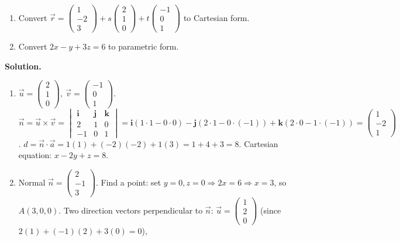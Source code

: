 \documentclass[11pt]{article}
\begin{document}
\begin{exoresolu}
\begin{enumerate}
\item Convert $\vec{r}=\begin{pmatrix}1\\-2\\3\end{pmatrix}+s\begin{pmatrix}2\\1\\0\end{pmatrix}+t\begin{pmatrix}-1\\0\\1\end{pmatrix}$ to Cartesian form.
\item Convert $2x-y+3z=6$ to parametric form.
\end{enumerate}
\tcblower
\textbf{Solution.}
\begin{enumerate}
\item $\vec{u}=\begin{pmatrix}2\\1\\0\end{pmatrix},\ \vec{v}=\begin{pmatrix}-1\\0\\1\end{pmatrix}$.
$\vec{n}=\vec{u}\times\vec{v}=\begin{vmatrix}\mathbf{i}&\mathbf{j}&\mathbf{k}\\2&1&0\\-1&0&1\end{vmatrix}
= \mathbf{i}(1\cdot1-0\cdot0) - \mathbf{j}(2\cdot1-0\cdot(-1)) + \mathbf{k}(2\cdot0-1\cdot(-1))
= \begin{pmatrix}1\\-2\\1\end{pmatrix}$.
$d=\vec{n}\cdot\vec{a}=1(1)+(-2)(-2)+1(3)=1+4+3=8$.
Cartesian equation: $\boxed{x-2y+z=8}$.
\item Normal $\vec{n}=\begin{pmatrix}2\\-1\\3\end{pmatrix}$. Find a point: set $y=0,z=0 \Rightarrow 2x=6 \Rightarrow x=3$, so $A(3,0,0)$.
Two direction vectors perpendicular to $\vec{n}$:
$\vec{u}=\begin{pmatrix}1\\2\\0\end{pmatrix}$ (since $2(1)+(-1)(2)+3(0)=0$),

\end{enumerate}
\end{exoresolu}
\end{document}
